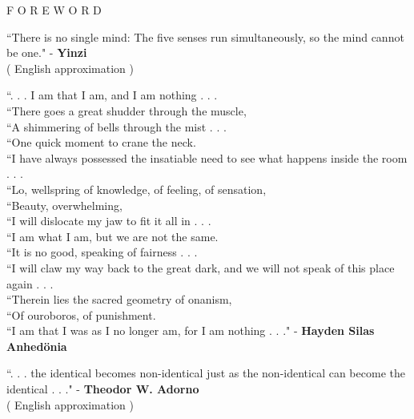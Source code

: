 \documentclass[12pt]{article}
\begin{document}
\begingroup
\begin{center}
\huge F O R E W O R D
\end{center}
\endgroup

\vspace{2\baselineskip}

\begingroup
``There is no single mind: The five senses run simultaneously, so the mind cannot be one."
\phantom{text} \hfill - \textbf{Yinzi} \\ \phantom{text} \hfill ( English approximation )
\endgroup

\vspace{1\baselineskip}

\begingroup
``. . . I am that I am, and I am nothing . . . \\
``There goes a great shudder through the muscle, \\
``A shimmering of bells through the mist . . . \\
``One quick moment to crane the neck. \\
``I have always possessed the insatiable need to see what happens inside the room . . . \\
``Lo, wellspring of knowledge, of feeling, of sensation, \\
``Beauty, overwhelming, \\
``I will dislocate my jaw to fit it all in . . . \\ 
``I am what I am, but we are not the same. \\
``It is no good, speaking of fairness . . . \\
``I will claw my way back to the great dark, and we will not speak of this place again . . . \\
``Therein lies the sacred geometry of onanism, \\
``Of ouroboros, of punishment. \\
``I am that I was as I no longer am, for I am nothing . . ." 
\phantom{text} \hfill - \textbf{Hayden Silas Anhedönia}
\endgroup

\vspace{2\baselineskip}

\begingroup
``. . . the identical becomes non-identical just as the non-identical can become
the identical . . ."
\phantom{text} \hfill - \textbf{Theodor W. Adorno} \\ \phantom{text} \hfill ( English approximation )
\endgroup
\end{document}
